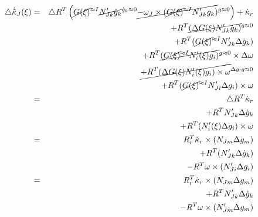 \begin{eqnarray*}
\triangle\dot{\tilde{\kappa}}_{J}(\xi) & = & \triangle R^{T}\left(\cancel{G(\xi)}^{\approx I}\cancel{N_{Jk}'\dot{g}_{k}}^{\dot{g}_{k}\approx0}\cancel{-\omega_{J}\times(\cancel{G(\xi)}^{\approx I}N_{Jk}'g_{k})}^{g\approx0}\right)+\dot{\kappa}_{r}\\
 &  & +R^{T}\cancel{(\Delta G(\xi)N_{Jk}'\dot{g}_{k})}^{\dot{g}\approx0}\\
 &  & +R^{T}(\cancel{G(\xi)}^{\approx I}N_{Jk}'\Delta\dot{g}_{k})\\
 &  & +R^{T}\cancel{(\cancel{G(\xi)}^{\approx I}N_{i}'(\xi)g_{i})}^{g\approx0}\times\Delta\omega\\
 &  & \cancel{+R^{T}(\Delta G(\xi)N_{i}'(\xi)g_{i})\times\omega}^{\Delta g\cdot g\approx0}\\
 &  & +R^{T}(\cancel{G(\xi)}^{\approx I}N_{Ji}'\Delta g_{i})\times\omega\\
 & = & \triangle R^{T}\dot{\kappa}_{r}\\
 &  & +R^{T}N_{Jk}'\Delta\dot{g}_{k}\\
 &  & +R^{T}(N_{i}'(\xi)\Delta g_{i})\times\omega\\
 & = & R_{r}^{T}\dot{\kappa}_{r}\times(N_{Jm}\Delta g_{m})\\
 &  & +R^{T}(N_{Jk}'\Delta\dot{g}_{k})\\
 &  & -R^{T}\omega\times(N_{Ji}'\Delta g_{i})\\
 & = & R_{r}^{T}\dot{\kappa}_{r}\times(N_{Jm}\Delta g_{m})\\
 &  & +R^{T}N_{Jk}'\Delta\dot{g}_{k}\\
 &  & -R^{T}\omega\times(N_{Jm}'\Delta g_{m})
\end{eqnarray*}



